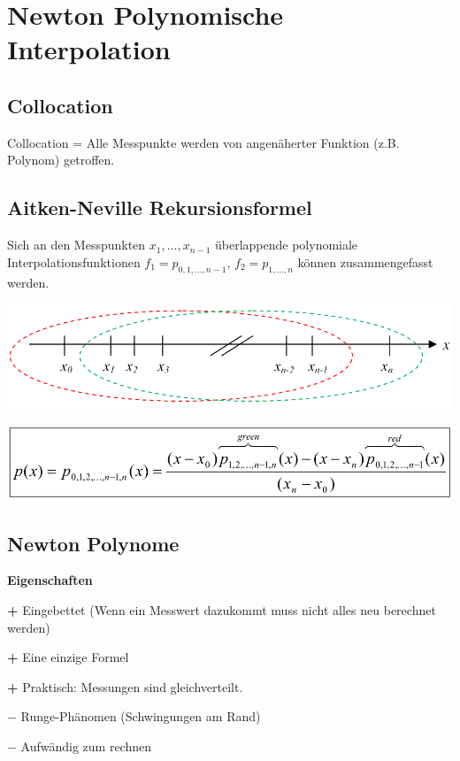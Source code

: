 
\section{Newton Polynomische Interpolation}
\subsection{Collocation}
Collocation = Alle Messpunkte werden von angenäherter Funktion (z.B. Polynom) getroffen.

\subsection{Aitken-Neville Rekursionsformel}
Sich an den Messpunkten $x_1,\ldots, x_{n-1}$ überlappende polynomiale Interpolationsfunktionen 
$f_1=p_{0,1,\ldots,n-1}$, $f_2=p_{1,\ldots,n}$ können zusammengefasst werden. 

\begin{minipage}{9.5cm}
\includegraphics[width=\textwidth]{bilder/aitkenNevilleIdee}
\end{minipage}
\hfill
\begin{minipage}{9.5cm}
\includegraphics[width=\textwidth]{bilder/aitkenNevilleFormel}
\end{minipage}

\subsection{Newton Polynome}
\textbf{Eigenschaften}
\begin{liste}
	\item[\textbf{+}] Eingebettet (Wenn ein Messwert dazukommt muss nicht alles neu berechnet werden)
	\item[\textbf{+}] Eine einzige Formel
	\item[\textbf{+}] Praktisch: Messungen sind gleichverteilt.
	\item[$\mathbf{-}$] Runge-Phänomen (Schwingungen am Rand)
	\item[$\mathbf{-}$] Aufwändig zum rechnen
\end{liste}

